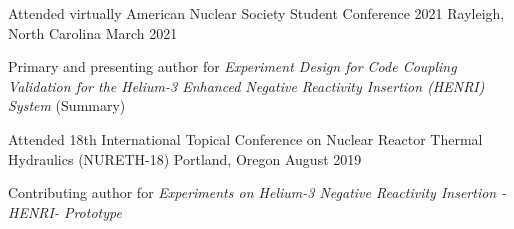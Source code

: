 \begin{cventries}
    \cventry
    {Attended virtually} %
    {American Nuclear Society Student Conference 2021} %
    {Rayleigh, North Carolina} %
    {March 2021} %
    {
    \begin{cvitems}
        \item{Primary and presenting author for \textit{Experiment Design for Code Coupling Validation for the Helium-3 Enhanced Negative Reactivity Insertion (HENRI) System} (Summary)}
    \end{cvitems}
    }

    \cventry
    {Attended} %
    {18th International Topical Conference on Nuclear Reactor Thermal Hydraulics (NURETH-18)} %
    {Portland, Oregon} %
    {August 2019} %
    {
    \begin{cvitems}
        \item{Contributing author for \textit{Experiments on Helium-3 Negative Reactivity Insertion -HENRI- Prototype}}
    \end{cvitems}
    }






\end{cventries}